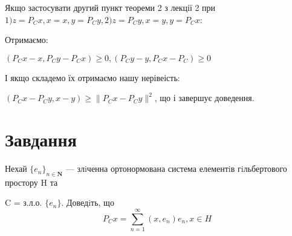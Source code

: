 \documentclass[a4paper]{extreport}
\begin{document}
    Якщо застосувати другий пункт теореми 2 з лекції 2 
    при $1)z = P_Cx, x = x, y = P_Cy, 2)z = P_Cy, x = y, y = P_Cx $:


    Отримаємо:


    $ (P_Cx - x, P_Cy - P_Cx) \geq 0 , (P_Cy - y, P_Cx - P_C) \geq 0$


    І якщо складемо їх отримаємо нашу нерівеість:


    $(P_Cx - P_Cy, x - y) \geq \|P_Cx - P_Cy \|^2  $, що і завершує доведення.



    \chapter{Завдання \theHchapter}


    \begin{tcolorbox}[title=Завдання]
        Нехай $\{e_n\}_{n \in \mathbf{N}} $ — злiченна ортонормована система елементiв 
        гiльбертового простору H та
        
        
        C = з.л.о. $\{e_n\}$. Доведiть, що
        $$ P_Cx = \sum_{n = 1}^{\infty}(x, e_n)e_n, x \in H $$
    \end{tcolorbox}

\end{document}
